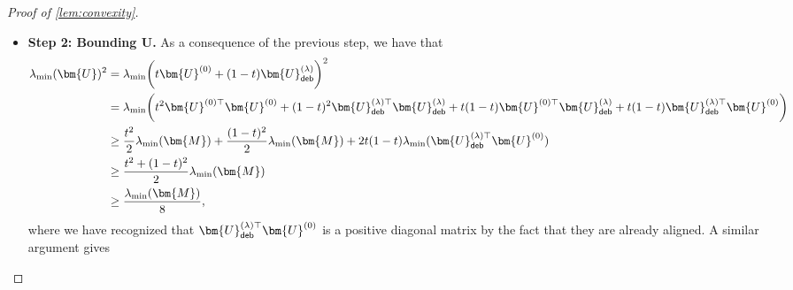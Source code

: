 \documentclass[10pt]{article}
\renewcommand{\t}{^{\top}}
\theoremstyle{definition}
\begin{document}
\begin{proof}[Proof of \cref{lem:convexity}]
\begin{itemize}
We now consider $\bm{U}_{{\sf deb}}^{(\lambda)}$.  We have that by \cref{thm:udebzdeb} it holds that  on the event $\mathcal{E}_{{\sf Good}}$
\begin{align}
    \bm{U}_{{\sf deb}}^{(\lambda)} \bm{U}_{{\sf deb}}^{(\lambda)\top} = \bm{Z}_{{\sf deb}}^{(\lambda)} = \bm{V}_U\big( \bm{\Sigma} + \lambda \bm{I} \big) \bm{V}_U\t.
\end{align}
Furthermore, on this same event, by \cref{thm:relatecvxncvx} it holds that
\begin{align}
    \| \bm{Z}^{(\lambda)} - \bm{M} \|_F \leq C \sigma \sqrt{dr}.
\end{align}
Consequently, it holds that
\begin{align}
    \|\bm{U}_{{\sf deb}}^{(\lambda)} \bm{U}_{{\sf deb}}^{(\lambda)\top} - \bm{M}\|_F \leq C \sigma \sqrt{dr}.  
\end{align}
Therefore, the same argument shows that $\lambda_{\min}(\bm{U}_{{\sf deb}}^{(\lambda)})^2 \geq \frac{\lambda_{\min}(\bm{M})}{2}$.  The triangle inequality also shows that 
\begin{align}
    \|\bm{U}_{{\sf deb}}^{(\lambda)}\|^2 \leq \| \bm{M} \| +   \|\bm{U}_{{\sf deb}}^{(\lambda)} \bm{U}_{{\sf deb}}^{(\lambda)\top} - \bm{M}\|_F \leq 2 \| \bm{M} \|.
\end{align}
The same bound holds for $\bm{U}^{(0)}$ as well.  
    \item \textbf{Step 2: Bounding $\bm{U}$.}  As a consequence of the previous step, we have that 
\begin{align}
    \lambda_{\min}(\bm{U})^2 &= \lambda_{\min}\bigg( t \bm{U}^{(0)} + (1 - t) \bm{U}^{(\lambda)}_{{\sf deb}} \bigg)^2 \\
    &= \lambda_{\min} \bigg( t^2 \bm{U}^{(0)\top} \bm{U}^{(0)} + (1 - t)^2 \bm{U}_{{\sf deb}}^{(\lambda)\top} \bm{U}_{{\sf deb}}^{(\lambda)} + t(1-t) \bm{U}^{(0)\top}\bm{U}_{{\sf deb}}^{(\lambda)}+ t(1-t)\bm{U}_{{\sf deb}}^{(\lambda)\top}\bm{U}^{(0)} \bigg) \\
    &\geq  \frac{t^2}{2} \lambda_{\min}(\bm{M}) + \frac{(1 - t)^2}{2} \lambda_{\min}(\bm{M}) + 2 t(1-t) \lambda_{\min}(\bm{U}_{{\sf deb}}^{(\lambda)\top}\bm{U}^{(0)}) \\
    &\geq \frac{t^2 + (1-t)^2}{2} \lambda_{\min}(\bm{M}) \\
    &\geq \frac{\lambda_{\min}(\bm{M})}{8},
\end{align}
where we have recognized that $\bm{U}_{{\sf deb}}^{(\lambda)\top}\bm{U}^{(0)}$ is a positive  diagonal matrix by the fact that they are already aligned.  A similar argument gives

\end{itemize}
\end{proof}
\end{document}
